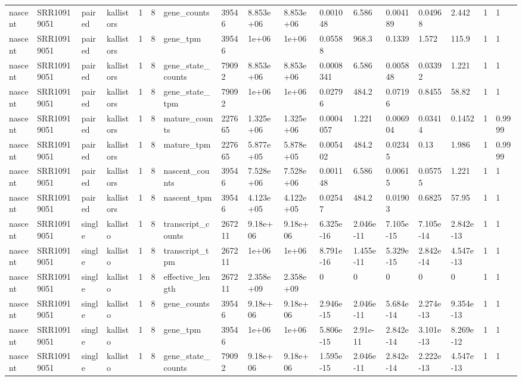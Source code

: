\begin{tabular}{lllllllllllllllll}
nascent & SRR10919051 & paired & kallistors & 1 & 8 & gene\_counts & 39546 & 8.853e+06 & 8.853e+06 & 0.001048 & 6.586 & 0.004189 & 0.04968 & 2.442 & 1 & 1 \\
nascent & SRR10919051 & paired & kallistors & 1 & 8 & gene\_tpm & 39546 & 1e+06 & 1e+06 & 0.05588 & 968.3 & 0.1339 & 1.572 & 115.9 & 1 & 1 \\
nascent & SRR10919051 & paired & kallistors & 1 & 8 & gene\_state\_counts & 79092 & 8.853e+06 & 8.853e+06 & 0.0008341 & 6.586 & 0.005848 & 0.03392 & 1.221 & 1 & 1 \\
nascent & SRR10919051 & paired & kallistors & 1 & 8 & gene\_state\_tpm & 79092 & 1e+06 & 1e+06 & 0.02796 & 484.2 & 0.07196 & 0.8455 & 58.82 & 1 & 1 \\
nascent & SRR10919051 & paired & kallistors & 1 & 8 & mature\_counts & 227665 & 1.325e+06 & 1.325e+06 & 0.0004057 & 1.221 & 0.006904 & 0.03414 & 0.1452 & 1 & 0.9999 \\
nascent & SRR10919051 & paired & kallistors & 1 & 8 & mature\_tpm & 227665 & 5.877e+05 & 5.878e+05 & 0.005402 & 484.2 & 0.02345 & 0.13 & 1.986 & 1 & 0.9999 \\
nascent & SRR10919051 & paired & kallistors & 1 & 8 & nascent\_counts & 39546 & 7.528e+06 & 7.528e+06 & 0.001148 & 6.586 & 0.00615 & 0.05755 & 1.221 & 1 & 1 \\
nascent & SRR10919051 & paired & kallistors & 1 & 8 & nascent\_tpm & 39546 & 4.123e+05 & 4.122e+05 & 0.02547 & 484.2 & 0.01903 & 0.6825 & 57.95 & 1 & 1 \\
nascent & SRR10919051 & single & kallisto & 1 & 8 & transcript\_counts & 267211 & 9.18e+06 & 9.18e+06 & 6.325e-16 & 2.046e-11 & 7.105e-15 & 7.105e-14 & 2.842e-13 & 1 & 1 \\
nascent & SRR10919051 & single & kallisto & 1 & 8 & transcript\_tpm & 267211 & 1e+06 & 1e+06 & 8.791e-16 & 1.455e-11 & 5.329e-15 & 2.842e-14 & 4.547e-13 & 1 & 1 \\
nascent & SRR10919051 & single & kallisto & 1 & 8 & effective\_length & 267211 & 2.358e+09 & 2.358e+09 & 0 & 0 & 0 & 0 & 0 & 1 & 1 \\
nascent & SRR10919051 & single & kallisto & 1 & 8 & gene\_counts & 39546 & 9.18e+06 & 9.18e+06 & 2.946e-15 & 2.046e-11 & 5.684e-14 & 2.274e-13 & 9.354e-13 & 1 & 1 \\
nascent & SRR10919051 & single & kallisto & 1 & 8 & gene\_tpm & 39546 & 1e+06 & 1e+06 & 5.806e-15 & 2.91e-11 & 2.842e-14 & 3.101e-13 & 8.269e-12 & 1 & 1 \\
nascent & SRR10919051 & single & kallisto & 1 & 8 & gene\_state\_counts & 79092 & 9.18e+06 & 9.18e+06 & 1.595e-15 & 2.046e-11 & 2.842e-14 & 2.222e-13 & 4.547e-13 & 1 & 1 \\

\end{tabular}
